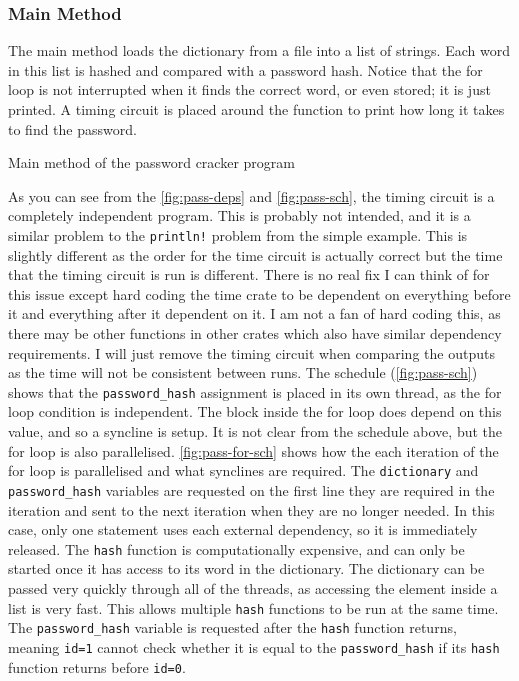 \subsubsection{Main Method}
The main method loads the dictionary from a file into a list of strings. Each word in this list is hashed and compared with a password hash. Notice that the for loop is not interrupted when it finds the correct word, or even stored; it is just printed. A timing circuit is placed around the function to print how long it takes to find the password.

\begin{code}
    \caption{Main method of the password cracker program}
\end{code}

As you can see from the \autoref{fig:pass-deps} and \autoref{fig:pass-sch}, the timing circuit is a completely independent program. This is probably not intended, and it is a similar problem to the \texttt{println!} problem from the simple example. This is slightly different as the order for the time circuit is actually correct but the time that the timing circuit is run is different. There is no real fix I can think of for this issue except hard coding the time crate to be dependent on everything before it and everything after it dependent on it. I am not a fan of hard coding this, as there may be other functions in other crates which also have similar dependency requirements. I will just remove the timing circuit when comparing the outputs as the time will not be consistent between runs.
The schedule (\autoref{fig:pass-sch}) shows that the \texttt{password\_hash} assignment is placed in its own thread, as the for loop condition is independent. The block inside the for loop does depend on this value, and so a syncline is setup. It is not clear from the schedule above, but the for loop is also parallelised. \autoref{fig:pass-for-sch} shows how the each iteration of the for loop is parallelised and what synclines are required.
The \texttt{dictionary} and \texttt{password\_hash} variables are requested on the first line they are required in the iteration and sent to the next iteration when they are no longer needed. In this case, only one statement uses each external dependency, so it is immediately released. The \texttt{hash} function is computationally expensive, and can only be started once it has access to its word in the dictionary. The dictionary can be passed very quickly through all of the threads, as accessing the element inside a list is very fast. This allows multiple \texttt{hash} functions to be run at the same time. The \texttt{password\_hash} variable is requested after the \texttt{hash} function returns, meaning \texttt{id=1} cannot check whether it is equal to the \texttt{password\_hash} if its \texttt{hash} function returns before \texttt{id=0}.

